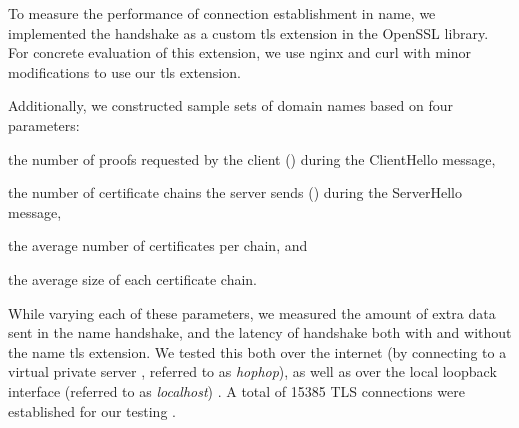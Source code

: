 
To measure the  
performance of connection establishment in \ac{name}, we
implemented the handshake as a custom \ac{tls} extension in the
OpenSSL library. For concrete evaluation of this extension, we use
nginx and curl with minor modifications to use our \ac{tls} extension.

Additionally, we constructed sample sets of domain names based
on four parameters:
\begin{inparaenum}
\item the number of proofs requested by the client (\numlas) during the ClientHello message,
\item the number of certificate chains the server   sends (\policy) during the ServerHello message,
\item the average number of certificates per chain, and
\item the average size of each certificate chain.
\end{inparaenum}
While varying each of these parameters, we measured the amount of
extra data sent in the \ac{name} handshake, and the latency of
handshake both with and without
 
the \ac{name} \ac{tls} extension. We
tested this both over the internet (by connecting to a virtual private server , referred to as \emph{hophop}), as well as over the local loopback
interface (referred to as \emph{localhost}) .
A total of 15385 TLS connections were established for our testing .

